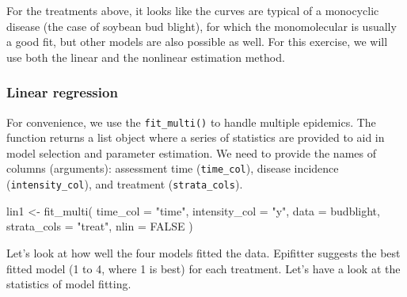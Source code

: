 \documentclass[
  letterpaper,
  DIV=11,
  numbers=noendperiod]{scrreprt}
\newenvironment{Shaded}{\begin{snugshade}}{\end{snugshade}}
\newcommand{\AttributeTok}[1]{\textcolor[rgb]{0.40,0.45,0.13}{#1}}
\newcommand{\ConstantTok}[1]{\textcolor[rgb]{0.56,0.35,0.01}{#1}}
\newcommand{\FunctionTok}[1]{\textcolor[rgb]{0.28,0.35,0.67}{#1}}
\newcommand{\NormalTok}[1]{\textcolor[rgb]{0.00,0.23,0.31}{#1}}
\newcommand{\OtherTok}[1]{\textcolor[rgb]{0.00,0.23,0.31}{#1}}
\newcommand{\SpecialCharTok}[1]{\textcolor[rgb]{0.37,0.37,0.37}{#1}}
\newcommand{\StringTok}[1]{\textcolor[rgb]{0.13,0.47,0.30}{#1}}
\begin{document}
For the treatments above, it looks like the curves are typical of a
monocyclic disease (the case of soybean bud blight), for which the
monomolecular is usually a good fit, but other models are also possible
as well. For this exercise, we will use both the linear and the
nonlinear estimation method.

\hypertarget{linear-regression}{%
\subsubsection{Linear regression}\label{linear-regression}}

For convenience, we use the \texttt{fit\_multi()} to handle multiple
epidemics. The function returns a list object where a series of
statistics are provided to aid in model selection and parameter
estimation. We need to provide the names of columns (arguments):
assessment time (\texttt{time\_col}), disease incidence
(\texttt{intensity\_col}), and treatment (\texttt{strata\_cols}).

\begin{Shaded}
\begin{Highlighting}[]
\NormalTok{lin1 }\OtherTok{\textless{}{-}} \FunctionTok{fit\_multi}\NormalTok{(}
  \AttributeTok{time\_col =} \StringTok{"time"}\NormalTok{,}
  \AttributeTok{intensity\_col =} \StringTok{"y"}\NormalTok{,}
  \AttributeTok{data =}\NormalTok{ budblight,}
  \AttributeTok{strata\_cols =} \StringTok{"treat"}\NormalTok{,}
  \AttributeTok{nlin =} \ConstantTok{FALSE}
\NormalTok{)}
\end{Highlighting}
\end{Shaded}

Let's look at how well the four models fitted the data. Epifitter
suggests the best fitted model (1 to 4, where 1 is best) for each
treatment. Let's have a look at the statistics of model fitting.

\begin{Shaded}
\end{Shaded}
\end{document}
